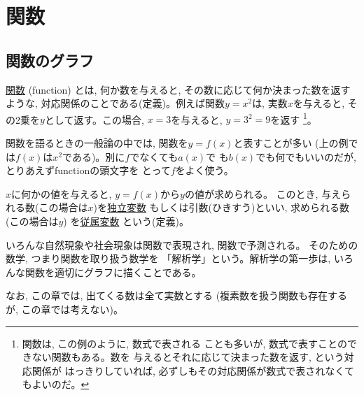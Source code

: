 \chapter{関数}\label{chapt_function}


\section{関数のグラフ}

\underline{関数} (function)
とは, 何か数を与えると, その数に応じて何か決まった数を返すような, 
対応関係のことである(定義)。例えば関数$y=x^2$は, 実数$x$を与えると, 
その2乗を$y$として返す。この場合, $x=3$を与えると, $y=3^2=9$を返す
\footnote{関数は, この例のように, 数式で表される
ことも多いが, 数式で表すことのできない関数もある。数を
与えるとそれに応じて決まった数を返す, という対応関係が
はっきりしていれば, 必ずしもその対応関係が数式で表されなくてもよいのだ。}。

関数を語るときの一般論の中では, 関数を$y=f(x)$と表すことが多い
(上の例では$f(x)$は$x^2$である)。別に$f$でなくても$a(x)$で
も$b(x)$でも何でもいいのだが, とりあえずfunctionの頭文字を
とって$f$をよく使う。

$x$に何かの値を与えると, $y=f(x)$から$y$の値が求められる。
このとき, 与えられる数(この場合は$x$)を\underline{独立変数} 
もしくは引数(ひきすう)といい, 求められる数(この場合は$y$)
を\underline{従属変数} 
という(定義)。

いろんな自然現象や社会現象は関数で表現され, 関数で予測される。
そのための数学, つまり関数を取り扱う数学を
「解析学」という。解析学の第一歩は, 
いろんな関数を適切にグラフに描くことである。

なお, この章では, 出てくる数は全て実数とする (複素数を扱う関数も存在するが, 
この章では考えない)。

